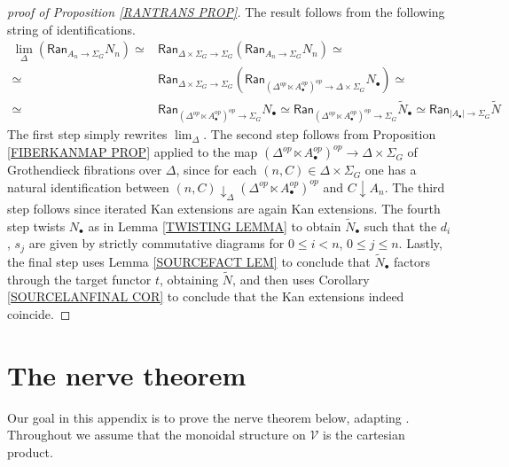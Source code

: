 \documentclass[a4paper,10pt
,draft
]{article}%
\numberwithin{equation}{section}
\numberwithin{figure}{section}
\theoremstyle{definition} %
\newcommand{\1}{\ensuremath{\mathbbm 1}}%
\begin{document}
\begin{proof}[proof of Proposition \ref{RANTRANS PROP}]
The result follows from the following string of identifications.
\begin{align*}
	\lim_{\Delta}
	\left(
	\mathsf{Ran}_{A_n \to \Sigma_G}
	N_{n}
	\right)
	\simeq &
	\mathsf{Ran}_{\Delta \times \Sigma_G \to \Sigma_G}
	\left(
	\mathsf{Ran}_{A_n \to \Sigma_G}
	N_n
	\right) \simeq
\\
	\simeq &
	\mathsf{Ran}_{\Delta \times \Sigma_G \to \Sigma_G}
	\left(
	\mathsf{Ran}_{(\Delta^{op} \ltimes A^{op}_{\bullet})^{op} \to
	\Delta \times \Sigma_G}
	N_{\bullet}
	\right) \simeq
\\
	\simeq &
	\mathsf{Ran}_{
	(\Delta^{op} \ltimes A^{op}_{\bullet})^{op} \to
	\Sigma_G}
	N_{\bullet}
	\simeq 
	\mathsf{Ran}_{
	(\Delta^{op} \ltimes A^{op}_{\bullet})^{op} \to \Sigma_G}
	\tilde{N}_{\bullet}
	\simeq
	\mathsf{Ran}_{
	|A_{\bullet}| \to \Sigma_G}
	\tilde{N}
\end{align*}
The first step simply rewrites 
$\lim_{\Delta}$. 
The second step 
follows from Proposition \ref{FIBERKANMAP PROP} applied to the map 
$(\Delta^{op} \ltimes A^{op}_{\bullet})^{op} \to
\Delta \times \Sigma_G$
of Grothendieck fibrations over $\Delta$,
since for each
$(n,C) \in \Delta \times \Sigma_G$
one has a natural identification
between
$(n,C) \downarrow_{\Delta} (\Delta^{op} \ltimes A^{op}_{\bullet})^{op}$
and
$C \downarrow A_n$.
The third step follows since iterated Kan extensions are again Kan extensions.
The fourth step twists $N_{\bullet}$
as in Lemma \ref{TWISTING LEMMA}
to obtain $\tilde{N}_{\bullet}$
such that the $d_i$, $s_j$ are given by strictly commutative diagrams for
$0\leq i < n$, $0\leq j \leq n$.
Lastly, the final step uses Lemma \ref{SOURCEFACT LEM}
to conclude that 
$\tilde{N}_{\bullet}$ factors through the
target functor $t$, obtaining $\tilde{N}$, 
and then uses 
Corollary \ref{SOURCELANFINAL COR}
to conclude that the Kan extensions indeed coincide.
\end{proof}









\section{The nerve theorem}\label{NERVE AP}

Our goal in this appendix is to prove the nerve theorem below,
adapting \cite[Prop. 5.3, Thm. 6.1]{MW08}.
Throughout we assume that the monoidal structure on $\mathcal{V}$
is the cartesian product.
\end{document}

